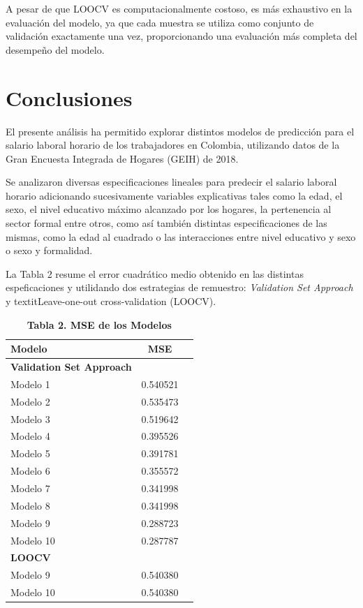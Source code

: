\documentclass[11pt, a4paper]{article}
\begin{document}
A pesar de que LOOCV es computacionalmente costoso, es más exhaustivo en la evaluación del modelo, ya que cada muestra se utiliza como conjunto de validación exactamente una vez, proporcionando una evaluación más completa del desempeño del modelo. 


\section{Conclusiones}
El presente análisis ha permitido explorar distintos modelos de predicción para el salario laboral horario de los trabajadores en Colombia, utilizando datos de la Gran Encuesta Integrada de Hogares (GEIH) de 2018. 

Se analizaron diversas especificaciones lineales para predecir el salario laboral horario adicionando sucesivamente variables explicativas tales como la edad, el sexo, el nivel educativo máximo alcanzado por los hogares, la pertenencia al sector formal entre otros, como así también distintas especificaciones de las mismas, como la edad al cuadrado o las interacciones entre nivel educativo y sexo o sexo y formalidad. 

La Tabla 2 resume el error cuadrático medio obtenido en las distintas espeficaciones y utilidando dos estrategias de remuestro: \textit{Validation Set Approach} y textit{Leave-one-out cross-validation (LOOCV)}.

\begin{table}[ht]
    \centering
    \caption*{\textbf{Tabla 2. MSE de los Modelos}}
    \begin{tabular}{lcc}
        \toprule
        \textbf{Modelo} & \textbf{MSE} \\
        \midrule
        \textbf{Validation Set Approach} & \\
        Modelo 1 & 0.540521 \\
        Modelo 2 & 0.535473 \\
        Modelo 3 & 0.519642 \\
        Modelo 4 & 0.395526 \\
        Modelo 5 & 0.391781 \\
        Modelo 6 & 0.355572 \\
        Modelo 7 & 0.341998 \\
        Modelo 8 & 0.341998 \\
        Modelo 9 & 0.288723 \\
        Modelo 10 & 0.287787 \\
        \midrule
        \textbf{LOOCV} & \\
        Modelo 9 & 0.540380 \\
        Modelo 10 & 0.540380 \\
        \bottomrule
    \end{tabular}
\end{table}
\end{document}

